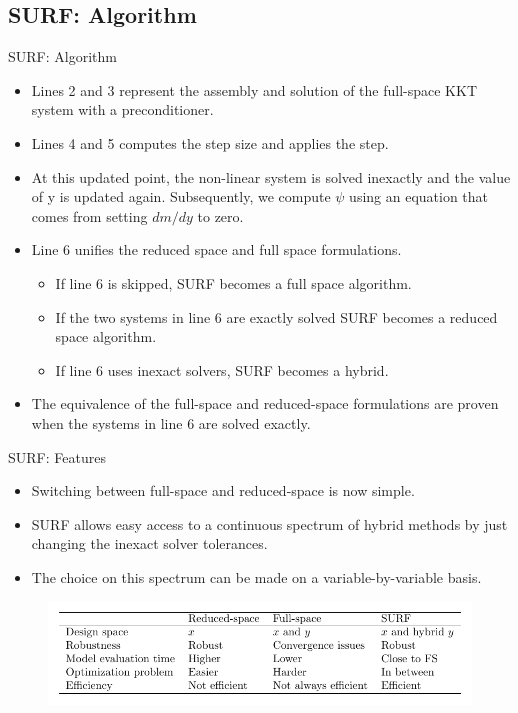 \documentclass{beamer}
\begin{document}
\subsection{SURF: Algorithm}
  \begin{frame}{SURF: Algorithm}
    \vspace{-10mm}
    \begin{itemize}
      \item Lines 2 and 3 represent the assembly and solution of the full-space KKT system with a preconditioner.
      \item Lines 4 and 5 computes the step size and applies the step.
      \item At this updated point, the non-linear system is solved inexactly and the value of y is updated again. Subsequently, we compute $\psi$ using an equation that comes from setting $dm/dy$ to zero. 
      
      \item Line 6 unifies the reduced space and full space formulations.
      \begin{itemize}
        \item If line 6 is skipped, SURF becomes a full space algorithm.
        \item If the two systems in line 6 are exactly solved SURF becomes a reduced space algorithm.
        \item If line 6 uses inexact solvers, SURF becomes a hybrid.
      \end{itemize}
      \item The equivalence of the full-space and reduced-space formulations are proven when the systems in line 6 are solved exactly.
    \end{itemize}
  \end{frame}

  \begin{frame}{SURF: Features}
    \vspace{-10mm}
    \begin{itemize}
      \item Switching between full-space and reduced-space is now simple.
      \item SURF allows easy access to a continuous spectrum of hybrid methods by just changing the inexact solver tolerances. 
      \item The choice on this spectrum can be made on a variable-by-variable basis.
    \end{itemize}
    \begin{figure}[ht]
      \centering
      \vspace{0mm}
      \includegraphics[width=\linewidth]{Figures/rs_vs_fs_vs_SURF_table}
      \vspace{0mm}
  \end{figure}
  \end{frame}
\end{document}
